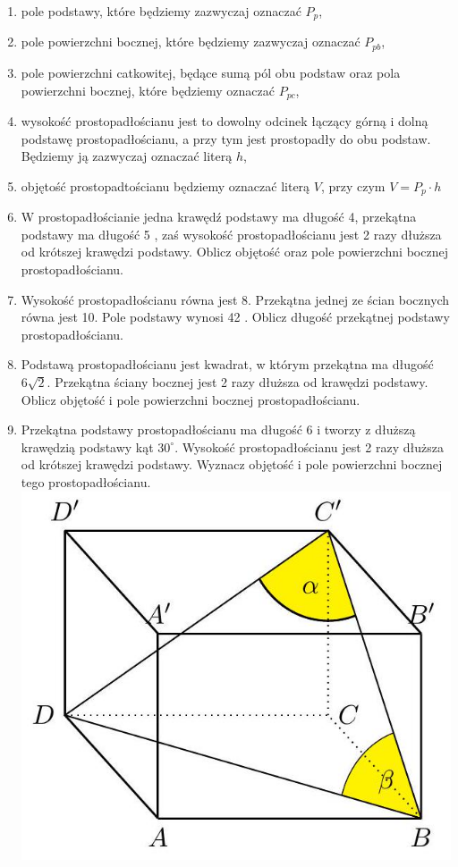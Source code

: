 \documentclass[10pt]{article}
\begin{document}
\begin{enumerate}
  \item pole podstawy, które będziemy zazwyczaj oznaczać \(P_{p}\),
  \item pole powierzchni bocznej, które będziemy zazwyczaj oznaczać \(P_{p b}\),
  \item pole powierzchni catkowitej, będące sumą pól obu podstaw oraz pola powierzchni bocznej, które będziemy oznaczać \(P_{p c}\),
  \item wysokość prostopadłościanu jest to dowolny odcinek łączący górną i dolną podstawę prostopadłościanu, a przy tym jest prostopadły do obu podstaw. Będziemy ją zazwyczaj oznaczać literą \(h\),
  \item objętość prostopadtościanu będziemy oznaczać literą \(V\), przy czym \(V=P_{p} \cdot h\)
  \item W prostopadłościanie jedna krawędź podstawy ma długość 4, przekątna podstawy ma długość 5 , zaś wysokość prostopadłościanu jest 2 razy dłuższa od krótszej krawędzi podstawy. Oblicz objętość oraz pole powierzchni bocznej prostopadłościanu.
  \item Wysokość prostopadłościanu równa jest 8. Przekątna jednej ze ścian bocznych równa jest 10. Pole podstawy wynosi 42 . Oblicz długość przekątnej podstawy prostopadłościanu.
  \item Podstawą prostopadłościanu jest kwadrat, w którym przekątna ma długość \(6 \sqrt{2}\). Przekątna ściany bocznej jest 2 razy dłuższa od krawędzi podstawy. Oblicz objętość i pole powierzchni bocznej prostopadłościanu.
  \item Przekątna podstawy prostopadłościanu ma długość 6 i tworzy z dłuższą krawędzią podstawy kąt \(30^{\circ}\). Wysokość prostopadłościanu jest 2 razy dłuższa od krótszej krawędzi podstawy. Wyznacz objętość i pole powierzchni bocznej tego prostopadłościanu.\\
\includegraphics[max width=\textwidth, center]{2024_11_21_e9b4faa005d5be2cc318g-072(1)}\\

\end{enumerate}
\end{document}
